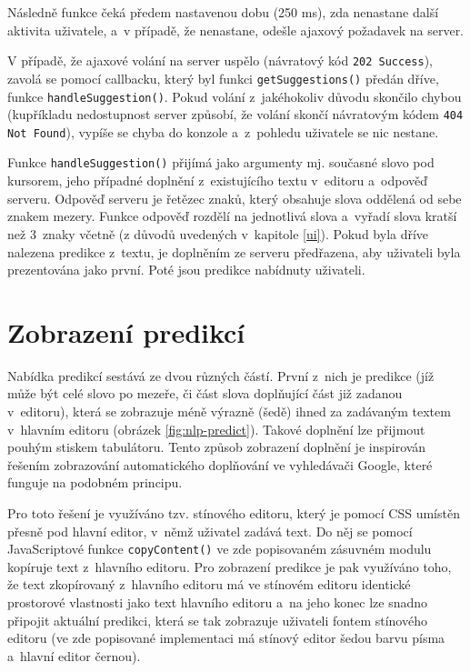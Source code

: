 \documentclass[a4paper,11pt,openany]{book} %
\begin{document}
Následně funkce čeká předem nastavenou dobu (250 ms), zda nenastane další aktivita uživatele, a~v případě, že nenastane, odešle ajaxový požadavek na server.

V případě, že ajaxové volání na server uspělo (návratový kód {\tt 202 Success}), zavolá se pomocí callbacku, který byl funkci {\tt getSuggestions()} předán dříve, funkce {\tt handleSuggestion()}. Pokud volání z~jakéhokoliv důvodu skončilo chybou (kupříkladu nedostupnost server způsobí, že volání skončí návratovým kódem {\tt 404 Not Found}), vypíše se chyba do konzole a~z~pohledu uživatele se nic nestane. 

Funkce {\tt handleSuggestion()} přijímá jako argumenty mj. současné slovo pod kursorem, jeho případné doplnění z~existujícího textu v~editoru a~odpověď serveru. Odpověď serveru je řetězec znaků, který obsahuje slova oddělená od sebe znakem mezery. Funkce odpověď rozdělí na jednotlivá slova a~vyřadí slova kratší než 3~znaky včetně (z důvodů uvedených v~kapitole \ref{ui}). Pokud byla dříve nalezena predikce z~textu, je doplněním ze serveru předřazena, aby uživateli byla prezentována jako první. Poté jsou predikce nabídnuty uživateli.

\section{Zobrazení predikcí}

Nabídka predikcí sestává ze dvou různých částí. První z~nich je predikce (jíž může být celé slovo po mezeře, či část slova doplňující část již zadanou v~editoru), která se zobrazuje méně výrazně (šedě) ihned za zadávaným textem v~hlavním editoru (obrázek \ref{fig:nlp-predict}). Takové doplnění lze přijmout pouhým stiskem tabulátoru. Tento způsob zobrazení doplnění je inspirován řešením zobrazování automatického doplňování ve vyhledávači Google, které funguje na podobném principu. 

Pro toto řešení je využíváno tzv. stínového editoru, který je pomocí CSS umístěn přesně pod hlavní editor, v~němž uživatel zadává text. Do něj se pomocí JavaScriptové funkce {\tt copyContent()} ve zde popisovaném zásuvném modulu kopíruje text z~hlavního editoru. Pro zobrazení predikce je pak využíváno toho, že text zkopírovaný z~hlavního editoru má ve stínovém editoru identické prostorové vlastnosti jako text hlavního editoru a~na jeho konec lze snadno připojit aktuální predikci, která se tak zobrazuje uživateli fontem stínového editoru (ve zde popisované implementaci má stínový editor šedou barvu písma a~hlavní editor černou).
\end{document}
